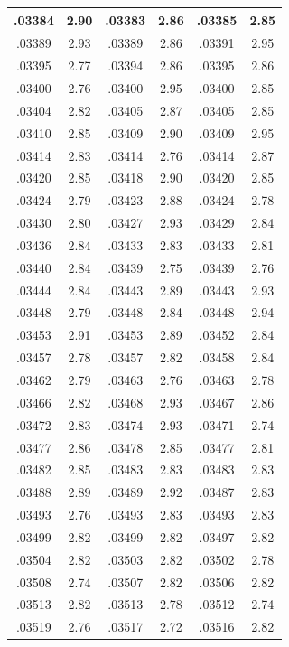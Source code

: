 \documentclass[10pt,twoside]{report}
\begin{document}
\begin{appendices}
\begin{longtable}{|c|c||c|c||c|c|}
.03384 & 2.90 & .03383 & 2.86 & .03385 & 2.85\\\hline
.03389 & 2.93 & .03389 & 2.86 & .03391 & 2.95\\\hline
.03395 & 2.77 & .03394 & 2.86 & .03395 & 2.86\\\hline
.03400 & 2.76 & .03400 & 2.95 & .03400 & 2.85\\\hline
.03404 & 2.82 & .03405 & 2.87 & .03405 & 2.85\\\hline
.03410 & 2.85 & .03409 & 2.90 & .03409 & 2.95\\\hline
.03414 & 2.83 & .03414 & 2.76 & .03414 & 2.87\\\hline
.03420 & 2.85 & .03418 & 2.90 & .03420 & 2.85\\\hline
.03424 & 2.79 & .03423 & 2.88 & .03424 & 2.78\\\hline
.03430 & 2.80 & .03427 & 2.93 & .03429 & 2.84\\\hline
.03436 & 2.84 & .03433 & 2.83 & .03433 & 2.81\\\hline
.03440 & 2.84 & .03439 & 2.75 & .03439 & 2.76\\\hline
.03444 & 2.84 & .03443 & 2.89 & .03443 & 2.93\\\hline
.03448 & 2.79 & .03448 & 2.84 & .03448 & 2.94\\\hline
.03453 & 2.91 & .03453 & 2.89 & .03452 & 2.84\\\hline
.03457 & 2.78 & .03457 & 2.82 & .03458 & 2.84\\\hline
.03462 & 2.79 & .03463 & 2.76 & .03463 & 2.78\\\hline
.03466 & 2.82 & .03468 & 2.93 & .03467 & 2.86\\\hline
.03472 & 2.83 & .03474 & 2.93 & .03471 & 2.74\\\hline
.03477 & 2.86 & .03478 & 2.85 & .03477 & 2.81\\\hline
.03482 & 2.85 & .03483 & 2.83 & .03483 & 2.83\\\hline
.03488 & 2.89 & .03489 & 2.92 & .03487 & 2.83\\\hline
.03493 & 2.76 & .03493 & 2.83 & .03493 & 2.83\\\hline
.03499 & 2.82 & .03499 & 2.82 & .03497 & 2.82\\\hline
.03504 & 2.82 & .03503 & 2.82 & .03502 & 2.78\\\hline
.03508 & 2.74 & .03507 & 2.82 & .03506 & 2.82\\\hline
.03513 & 2.82 & .03513 & 2.78 & .03512 & 2.74\\\hline
.03519 & 2.76 & .03517 & 2.72 & .03516 & 2.82\\\hline

\end{longtable}
\end{appendices}
\end{document}
